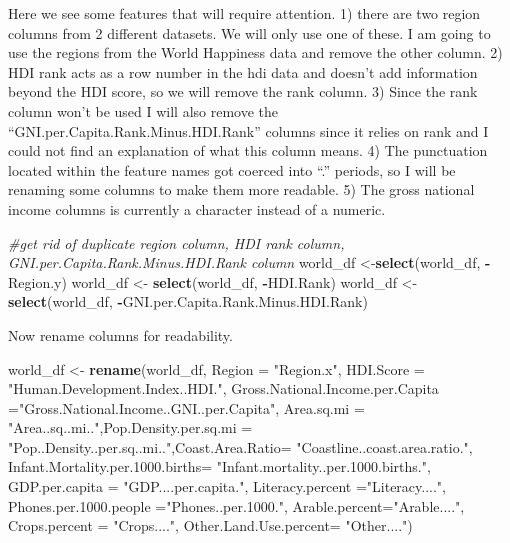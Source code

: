\documentclass[]{article}
\newenvironment{Shaded}{\begin{snugshade}}{\end{snugshade}}
\newcommand{\CommentTok}[1]{\textcolor[rgb]{0.56,0.35,0.01}{\textit{#1}}}
\newcommand{\DataTypeTok}[1]{\textcolor[rgb]{0.13,0.29,0.53}{#1}}
\newcommand{\KeywordTok}[1]{\textcolor[rgb]{0.13,0.29,0.53}{\textbf{#1}}}
\newcommand{\NormalTok}[1]{#1}
\newcommand{\OperatorTok}[1]{\textcolor[rgb]{0.81,0.36,0.00}{\textbf{#1}}}
\newcommand{\StringTok}[1]{\textcolor[rgb]{0.31,0.60,0.02}{#1}}
\begin{document}
Here we see some features that will require attention. 1) there are two
region columns from 2 different datasets. We will only use one of these.
I am going to use the regions from the World Happiness data and remove
the other column. 2) HDI rank acts as a row number in the hdi data and
doesn't add information beyond the HDI score, so we will remove the rank
column. 3) Since the rank column won't be used I will also remove the
``GNI.per.Capita.Rank.Minus.HDI.Rank'' columns since it relies on rank
and I could not find an explanation of what this column means. 4) The
punctuation located within the feature names got coerced into ``.''
periods, so I will be renaming some columns to make them more readable.
5) The gross national income columns is currently a character instead of
a numeric.

\begin{Shaded}
\begin{Highlighting}[]
\CommentTok{#get rid of duplicate region column, HDI rank column, GNI.per.Capita.Rank.Minus.HDI.Rank column}
\NormalTok{world_df <-}\KeywordTok{select}\NormalTok{(world_df, }\OperatorTok{-}\NormalTok{Region.y) }
\NormalTok{world_df <-}\StringTok{ }\KeywordTok{select}\NormalTok{(world_df, }\OperatorTok{-}\NormalTok{HDI.Rank) }
\NormalTok{world_df <-}\StringTok{ }\KeywordTok{select}\NormalTok{(world_df, }\OperatorTok{-}\NormalTok{GNI.per.Capita.Rank.Minus.HDI.Rank)}
\end{Highlighting}
\end{Shaded}

Now rename columns for readability.

\begin{Shaded}
\begin{Highlighting}[]
\NormalTok{world_df <-}\StringTok{ }\KeywordTok{rename}\NormalTok{(world_df, }\DataTypeTok{Region =} \StringTok{"Region.x"}\NormalTok{, }\DataTypeTok{HDI.Score =} \StringTok{"Human.Development.Index..HDI."}\NormalTok{, }\DataTypeTok{Gross.National.Income.per.Capita =}\StringTok{"Gross.National.Income..GNI..per.Capita"}\NormalTok{, }\DataTypeTok{Area.sq.mi =} \StringTok{"Area..sq..mi.."}\NormalTok{,}\DataTypeTok{Pop.Density.per.sq.mi =}  \StringTok{"Pop..Density..per.sq..mi.."}\NormalTok{,}\DataTypeTok{Coast.Area.Ratio=} \StringTok{"Coastline..coast.area.ratio."}\NormalTok{, }\DataTypeTok{Infant.Mortality.per.1000.births=} \StringTok{"Infant.mortality..per.1000.births."}\NormalTok{, }\DataTypeTok{GDP.per.capita =} \StringTok{"GDP....per.capita."}\NormalTok{, }\DataTypeTok{Literacy.percent =}\StringTok{"Literacy...."}\NormalTok{, }\DataTypeTok{Phones.per.1000.people =}\StringTok{"Phones..per.1000."}\NormalTok{, }\DataTypeTok{Arable.percent=}\StringTok{"Arable...."}\NormalTok{, }\DataTypeTok{Crops.percent =} \StringTok{"Crops...."}\NormalTok{, }\DataTypeTok{Other.Land.Use.percent=} \StringTok{"Other...."}\NormalTok{)}
\end{Highlighting}
\end{Shaded}
\end{document}
